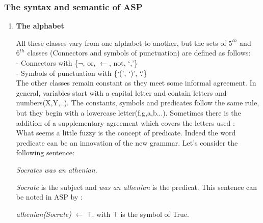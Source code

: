 \subsubsection{The syntax and semantic of ASP}
\label{sectionSyntaxeASP}
\begin{enumerate}
\item \textbf{The alphabet}

All these classes vary from one alphabet to another, but the sets of $ 5^{th} $ and $ 6^{th} $ classes (Connectors and symbols of punctuation) are defined as follows:\\

- Connectors with \{$\neg$, or, $\leftarrow$, not, ‘,’\} \\
- Symbols of punctuation with \{‘(’, ‘)’, ‘.’\} \\

The other classes remain constant as they meet some informal agreement. In general, variables start with a capital letter and contain letters and numbers(X,Y,..). The constants, symbols and predicates follow the same rule, but they begin with a lowercase letter(f,g,a,b...). Sometimes there is the addition of a supplementary agreement which covers the letters used \cite{baral2003knowledge} : \\

What seems a little fuzzy is the concept of predicate. Indeed the word predicate can be an innovation of the new grammar. Let's consider the following sentence: 
\begin{tabbing}
 \textit{Socrates was an athenian.} 
\end{tabbing}
\textit{Socrate} is the subject and \textit{was an athenian} is the predicat. This sentence can be noted in ASP by :
\begin{tabbing}
 \textit{athenian(Socrate) }$\leftarrow ~ \top$. \hspace{2cm} with $\top$ is the symbol of True.
\end{tabbing} 


\end{enumerate}
